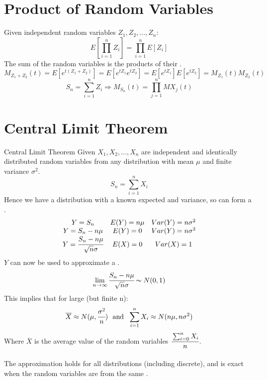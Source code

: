 \section{Product of Random Variables}
Given independent random variables $Z_1, Z_2, \dots, Z_n$:
\[E[\prod_{i=1}^nZ_i] = \prod_{i=1}^nE[Z_i]\]
The sum of the random variables is the products of their .
\[M_{Z_1 + Z_2}(t) = E[e^{t(Z_1 + Z_2)}] = E[e^{tZ_1}e^{tZ_2}] = E[e^{tZ_1}]E[e^{tZ_2}] = M_{Z_1}(t)M_{Z_2}(t)\]
\[S_n = \sum_{i=1}^nZ_i \Rightarrow M_{S_n}(t) = \prod_{j=1}^nM{X_j}(t)\]

\section{Central Limit Theorem}
\begin{definitionbox}{Central Limit Theorem}
	Given $X_1, X_2, \dots, X_n$ are independent and identically distributed random variables from any distribution with mean $\mu$ and finite variance $\sigma^2$.
	\[S_n = \sum_{i=1}^nX_i\]
	Hence we have a distribution with a known expected and variance, so can form a .
	\[\begin{matrix}
			Y = S_n                                 & E(Y) = n \mu & Var(Y) = n \sigma^2 \\
			Y = S_n - n \mu                         & E(Y) = 0     & Var(Y) = n \sigma^2 \\
			Y = \cfrac{S_n - n \mu}{\sqrt{n}\sigma} & E(X) = 0     & Var(X) = 1          \\
		\end{matrix}\]
	$Y$ can now be used to approximate a .
	\[\lim_{n \to \infty}\cfrac{S_n - n \mu}{\sqrt{n}\sigma} \thicksim N(0,1)\]
	This implies that for large (but finite n):
	\[\overline{X} \approx N(\mu, \cfrac{\sigma^2}{n}) \ \text{ and } \ \sum_{i=1}^n X_i \approx N(n \mu, n \sigma^2)\]
	Where $\overline{X}$ is the average value of the random variables $\cfrac{\sum_{i=0}^n X_i}{n}$.
	\\
	\\ The approximation holds for all distributions (including discrete), and is exact when the random variables are from the same .
\end{definitionbox}
